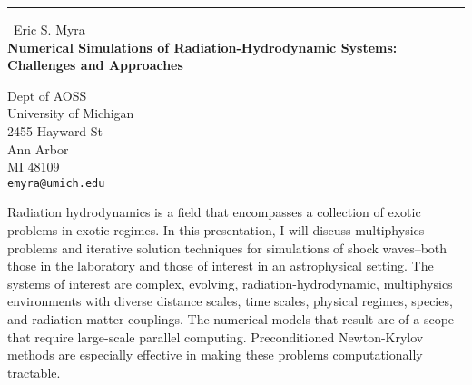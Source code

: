 \documentclass{report}
\begin{document}
\begin{center}
\rule{6in}{1pt} \
{\large Eric S. Myra \\
{\bf Numerical Simulations of Radiation-Hydrodynamic Systems: Challenges and Approaches}}

Dept of AOSS \\ University of Michigan \\ 2455 Hayward St \\ Ann Arbor \\ MI 48109
\\
{\tt emyra@umich.edu}\end{center}

Radiation hydrodynamics is a field that encompasses a collection of
exotic problems in exotic regimes. In this presentation, I will discuss
multiphysics problems and iterative solution techniques for simulations
of shock waves--both those in the laboratory and those of interest in an
astrophysical setting. The systems of interest are complex, evolving,
radiation-hydrodynamic, multiphysics environments with diverse distance
scales, time scales, physical regimes, species, and radiation-matter
couplings. The numerical models that result are of a scope that require
large-scale parallel computing. Preconditioned Newton-Krylov methods are
especially effective in making these problems computationally tractable.
\end{document}
